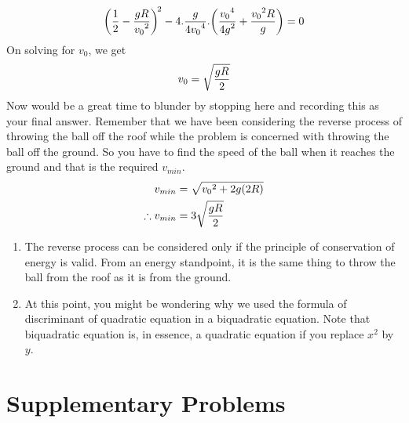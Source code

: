 \begin{enumerate} [label=\roman*]
\begin{equation*}
\biggl(\frac{\displaystyle 1}{\displaystyle 2}-\frac{\displaystyle gR}{\displaystyle {v_0}^2} \biggr)^{\!2} - 4.\frac{\displaystyle g}{\displaystyle 4{v_0}^4}.\biggl(\frac{\displaystyle {v_0}^4}{\displaystyle 4g^2}+\frac{\displaystyle {v_0}^2R}{\displaystyle g}\biggr)=0
\end{equation*}
On solving for $v_0$, we get
\begin{equation*}
v_0=\sqrt{\frac{\displaystyle gR}{\displaystyle 2}}
\end{equation*}
Now would be a great time to blunder by stopping here and recording this as your final answer. Remember that we have been considering the reverse process of throwing the ball off the roof while the problem is concerned with throwing the ball off the ground. So you have to find the speed of the ball when it reaches the ground and that is the required $v_{min}$.
\begin{align}
v_{min}&=\sqrt{{v_0}^2+2g(2R)}\nonumber\\
\therefore v_{min}&= 3\sqrt{\frac{\displaystyle gR}{\displaystyle 2}} \label{eq30}
\end{align}

\begin{note}
\begin{enumerate}
\item The reverse process can be considered only if the principle of conservation of energy is valid. From an energy standpoint, it is the same thing to throw the ball from the roof as it is from the ground.

\item At this point, you might be wondering why we used the formula of discriminant of quadratic equation in a biquadratic equation. Note that biquadratic equation is, in essence, a quadratic equation if you replace $x^2$ by $y$.
\end{enumerate}
\end{note}

\end{enumerate}

\section{Supplementary Problems}

